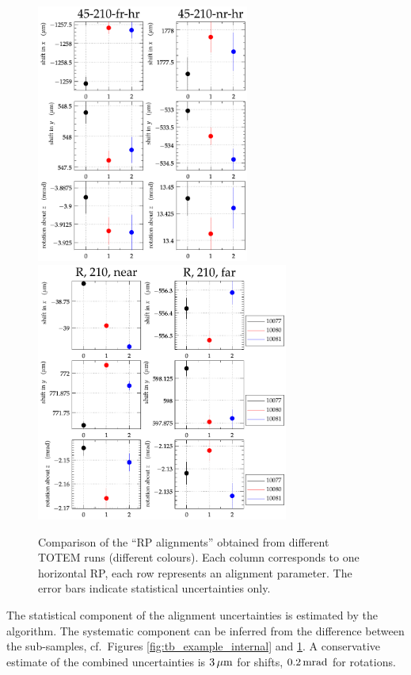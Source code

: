 \documentclass[TOTEM]{cern/cernphprep}
\def\un#1{\,{\rm #1}}
\begin{document}
\begin{figure}[h!]
\begin{center}
\includegraphics[height=8.5cm]{fig/calibration_fill/plots_per_rp_left.pdf}
\includegraphics[height=8.5cm]{fig/calibration_fill/plots_per_rp_right.pdf}
\caption{%
Comparison of the ``RP alignments'' obtained from different TOTEM runs (different colours). Each column corresponds to one horizontal RP, each row represents an alignment parameter. The error bars indicate statistical uncertainties only.
}
\label{fig:tb_example_rp}
\end{center}
\end{figure}

The statistical component of the alignment uncertainties is estimated by the algorithm. The systematic component can be inferred from the difference between the sub-samples, cf.~Figures \ref{fig:tb_example_internal} and \ref{fig:tb_example_rp}. A conservative estimate of the combined uncertainties is $3\un{\mu m}$ for shifts, $0.2\un{mrad}$ for rotations.
\end{document}
